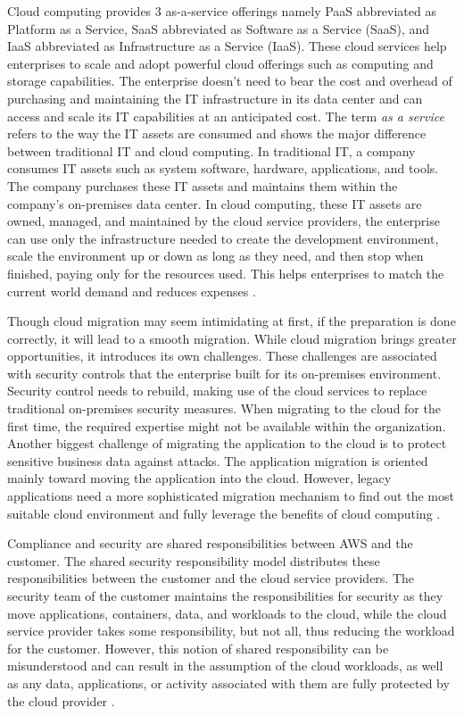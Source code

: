 \par Cloud computing provides 3 as-a-service offerings
namely PaaS abbreviated as Platform as a Service,
SaaS abbreviated as Software
as a Service
(SaaS), and IaaS abbreviated as Infrastructure
as a
Service
(IaaS).
These cloud
services help enterprises to scale and adopt powerful cloud offerings such as computing and storage capabilities.
The enterprise doesn't need to bear the cost and overhead
of purchasing and maintaining the IT infrastructure in its
data center and can access and scale its IT capabilities at
an anticipated cost.
The term \textit{as a service} refers to the way the IT assets are consumed and shows the major difference between traditional IT and cloud computing.
In traditional IT, a company consumes IT assets such as system software, hardware, applications, and tools.
The company purchases these IT assets and maintains them within the company’s on-premises data center.
In cloud computing, these IT assets are owned, managed,
and maintained by the cloud service providers, the enterprise can use only the infrastructure needed to create the development environment, scale the environment up or down as long as they need, and then stop when finished, paying only for the resources used. This helps enterprises to match the current world demand and reduces expenses \cite{3}.

\par Though cloud migration may seem intimidating at
first, if the preparation is done correctly, it will lead to a smooth migration.
While cloud migration brings greater opportunities, it introduces its own challenges.
These challenges are associated with security controls
that the enterprise built for its on-premises environment.
Security control needs to rebuild, making use of the cloud services to replace traditional on-premises security measures.
When migrating to the cloud for the first time, the required expertise might not be available within the organization.
Another biggest challenge of migrating the application to the cloud is to protect sensitive business data against attacks.
The application migration is oriented mainly toward moving the application into the cloud.
However, legacy applications need a more sophisticated migration mechanism to find out the most suitable cloud environment and fully leverage the benefits of cloud computing \cite{4}.

\par Compliance and security are shared responsibilities between AWS and the customer.
The shared security responsibility model distributes these
responsibilities between the customer and the cloud
service providers.
The security team of the customer maintains the
responsibilities for security as they move applications,
containers, data, and workloads to the cloud, while the
cloud service provider takes some responsibility, but not
all, thus reducing the workload for the customer.
However, this notion of shared responsibility can be misunderstood and can result in the assumption of the cloud
workloads, as well as any data, applications, or activity associated with them are fully protected by the cloud provider \cite{5}.



